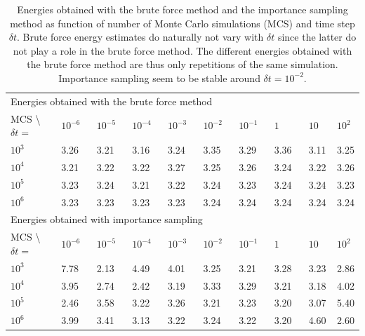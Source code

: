\begin{table}[h!]
	\centering 
	\begin{tabular}{l @{ } l @{ } l @{ } l @{ } l @{ } l @{ } l @{ } l @{ } l @{ } l }
	\toprule
	\multicolumn{9}{l}{Energies obtained with the brute force method} \\
	MCS \textbackslash  $\delta t = \quad$ & $10^{-6}~~~$ & $10^{-5}~~~$  & $10^{-4}~~~$  & $10^{-3} ~~~$  & $ 10^{-2} ~~~$ & $ 10^{-1} ~~~$  & $ 1 \qquad $  & $ 10 ~~~~$  & $ 10^{2}$ \\
	\midrule
	$10^3$ & 3.26 &  3.21 & 3.16 & 3.24 &  3.35 &  3.29 & 3.36 &  3.11 &  3.25\\
	\shaderow $10^4$ &  3.21 &   3.22 &    3.22 &   3.27 &  3.25 &  3.26 & 3.24 &   3.22 &  3.26 \\
	$10^5$ & 3.23 &    3.24 &   3.21 &  3.22 &  3.24 &  3.23 & 3.24 &   3.24 &  3.23 \\
	\shaderow $10^6$ & 3.23 &   3.23 &   3.23 &  3.23 &   3.24 &  3.24 & 3.24 &   3.24 &  3.24 \\
	\bottomrule
	\toprule
	\multicolumn{9}{l}{Energies obtained with importance sampling} \\
	MCS \textbackslash  $\delta t = \quad$ & $10^{-6}~~~$ & $10^{-5}~~~$  & $10^{-4}~~~$  & $10^{-3} ~~~$  & $ 10^{-2} ~~~$ & $ 10^{-1} ~~~$  & $ 1 ~~~~$  & $ 10 ~~~~$  & $ 10^{2}$ \\
	\midrule
	$10^3$ & 7.78 &   2.13 &   4.49 &  4.01 &  3.25 &  3.21 &   3.28 &  3.23 &  2.86 \\
	\shaderow $10^4$ &  3.95 &   2.74 &   2.42 &   3.19 &  3.33 &  3.29 &   3.21 &   3.18 &   4.02 \\
	$10^5$ & 2.46 &  3.58 &   3.22 &   3.26 &  3.21 &   3.23 &  3.20 &   3.07 &   5.40 \\
	\shaderow $10^6$ & 3.99 &   3.41 &  3.13 &  3.22 &  3.24 &  3.22 &  3.20 &  4.60 &  2.60 \\
	\bottomrule
	\end{tabular}
	\caption{Energies obtained with the brute force method and the importance sampling method as function of number of  		Monte Carlo simulations (MCS) and time step $\delta t$. 
			Brute force energy estimates do naturally not vary with $\delta t$ since the latter do not play a role in the brute force method. 
			The different energies obtained with the brute force method are thus only repetitions of the same simulation.
			Importance sampling seem to be stable around $\delta t = 10^{-2}$.}
	\label{tab:importance_sampling}
\end{table}


